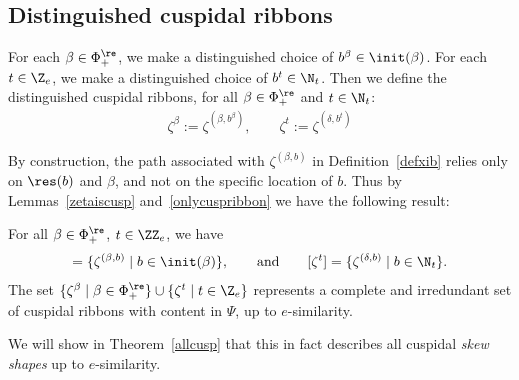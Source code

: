 \subsection{Distinguished cuspidal ribbons}
For each \(\beta \in \Phi_+^\re\), we make a distinguished choice of \(b^\beta \in \init(\beta)\). For each \(t \in \Z_e\), we make a distinguished choice of \(b^t \in \N_t\). Then we define the distinguished cuspidal ribbons, for all \(\beta \in \Phi_+^\re\) and \(t \in \N_t\):
\begin{align*}
\zeta^\beta := \zeta^{(\beta, b^{\beta})}, \qquad \zeta^t := \zeta^{(\delta, b^t)}
\end{align*}

By construction, the path associated with \(\zeta^{(\beta, b)}\) in Definition~\ref{defxib} relies only on \(\res(b)\) and \(\beta\), and not on the specific location of \(b\). Thus by Lemmas~\ref{zetaiscusp} and~\ref{onlycuspribbon} we have the following result:

\begin{prop}\label{allcusprib}
For all \(\beta \in \Phi_+^\re\), \(t \in \ZZ_e\), we have
\begin{align*}
[\zeta^{\beta}] = \{\zeta^{(\beta,b)} \mid b \in \init(\beta)\},
\qquad
\textup{and}
\qquad
[\zeta^{t}] = \{\zeta^{(\delta,b)} \mid b \in \N_t\}.
\end{align*}
The set \(\{\zeta^{\beta} \mid \beta \in \Phi_+^\re\} \cup \{\zeta^t \mid t \in \Z_e\}\) represents a complete and irredundant set of cuspidal ribbons with content in \(\Psi\), up to \(e\)-similarity.
\end{prop}

We will show in Theorem~\ref{allcusp} that this in fact describes all cuspidal {\em skew shapes} up to \(e\)-similarity.



